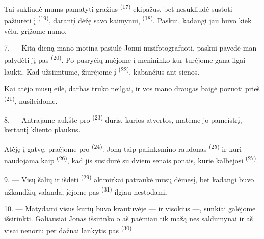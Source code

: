 Tai sukliudė mums pamatyti gražius  \textsuperscript{(17)}
ekipažus, bet nesukliudė sustoti pažiūrėti į 
\textsuperscript{(19)}, darantį dėžę savo kaimynui,  \textsuperscript{(18)}. Paskui, kadangi jau buvo kiek vėlu, grįžome namo.

\VUsaut{3.0mm}

7. --- Kitą dieną mano motina pasiūlė Jonui nusifotografuoti, paskui pavedė man
palydėti jį pas  \textsuperscript{(20)}. Po pusryčių nuėjome į
menininko  kur turėjome gana ilgai laukti. Kad užsiimtume, žiūrėjome
į  \textsuperscript{(22)}, kabančius ant sienos.

Kai atėjo mūsų eilė, darbas truko neilgai, ir vos mano draugas baigė pozuoti prieš
 \textsuperscript{(21)}, nusileidome.

8. --- Antrajame aukšte pro  \textsuperscript{(23)} duris, kurios
atvertos, matėme jo pameistrį, kertantį kliento plaukus.

Atėję į gatvę, praėjome pro  \textsuperscript{(24)}. Joną taip
palinksmino raudonas  \textsuperscript{(25)} ir 
kuri naudojama kaip  \textsuperscript{(26)}, kad jis susidūrė su dviem
senais ponais, kurie kalbėjosi  \textsuperscript{(27)}.

\VUsaut{3.0mm}

9. --- Visų šalių  ir  išdėti 
\textsuperscript{(29)}  akimirkai patraukė mūsų dėmesį, bet kadangi
buvo užkandžių valanda, įėjome pas  \textsuperscript{(31)} ilgiau
nestodami.

10. --- Matydami visus  kurių buvo krautuvėje ---
 ir visokius  ---,
sunkiai galėjome išsirinkti. Galiausiai Jonas išsirinko  o
aš paėmiau tik mažą  nes saldumynai  ir aš visai nenoriu per dažnai lankytis pas 
\textsuperscript{(30)}.

\VUsaut{3.0mm}

